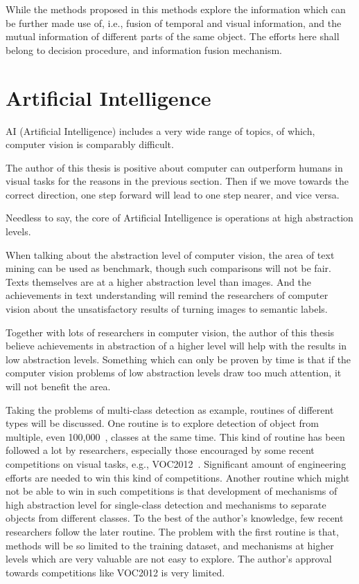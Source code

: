 While the methods proposed in this methods explore the information which can be further made use of, i.e., fusion of temporal and visual information, and the mutual information of different parts of the same object. The efforts here shall belong to decision procedure, and information fusion mechanism.

\section{Artificial Intelligence}
AI (Artificial Intelligence) includes a very wide range of topics, of which, computer vision is comparably difficult.

The author of this thesis is positive about computer can outperform humans in visual tasks for the reasons in the previous section. Then if we move towards the correct direction, one step forward will lead to one step nearer, and vice versa.

Needless to say, the core of Artificial Intelligence is operations at high abstraction levels.

When talking about the abstraction level of computer vision, the area of text mining can be used as benchmark, though such comparisons will not be fair. Texts themselves are at a higher abstraction level than images. And the achievements in text understanding will remind the researchers of computer vision about the unsatisfactory results of turning images to semantic labels.

Together with lots of researchers in computer vision, the author of this thesis believe achievements in abstraction of a higher level will help with the results in low abstraction levels. Something which can only be proven by time is that if the computer vision problems of low abstraction levels draw too much attention, it will not benefit the area.


Taking the problems of multi-class detection as example, routines of different types will be discussed. One routine is to explore detection of object from multiple, even 100,000~\cite{408}, classes at the same time. This kind of routine has been followed a lot by researchers, especially those encouraged by some recent competitions on visual tasks, e.g., VOC2012~\cite{voc}. Significant amount of engineering efforts are needed to win this kind of competitions. Another routine which might not be able to win in such competitions is that
development of mechanisms of high abstraction level for single-class detection and mechanisms to separate objects from different classes. To the best of the author's knowledge, few recent researchers follow the later routine. The problem with the first routine is that, methods will be so limited to the training dataset, and mechanisms at higher levels which are very valuable are not easy to explore. The author's approval towards competitions like VOC2012 is very limited.

